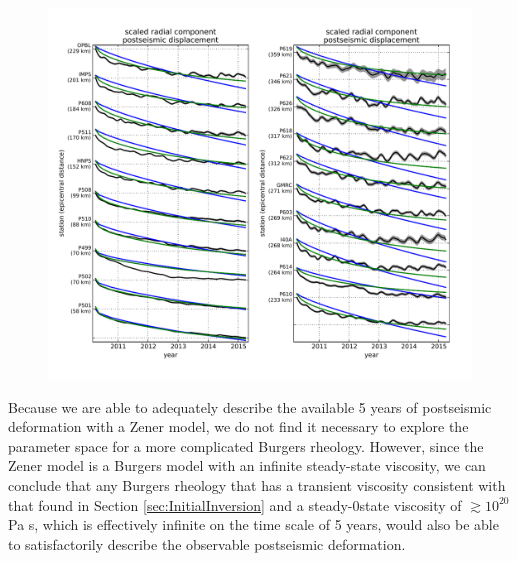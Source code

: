 \documentclass[review]{elsarticle}
\begin{document}
\begin{figure}
\includegraphics[scale=0.8]{Figures/RecordSectionFinal}
\centering 
\caption{}
\label{fig:RecordSection2}
\end{figure} 

Because we are able to adequately describe the available 5 years of postseismic deformation with a Zener model, we do not find it necessary to explore the parameter space for a more complicated Burgers rheology.  However, since the Zener model is a Burgers model with an infinite steady-state viscosity, we can conclude that any Burgers rheology that has a transient viscosity consistent with that found in Section \ref{sec:InitialInversion} and a steady-0state viscosity of $\gtrsim10^{20}$ Pa s, which is effectively infinite on the time scale of 5 years, would also be able to satisfactorily describe the observable postseismic deformation.        
  
\end{document}
